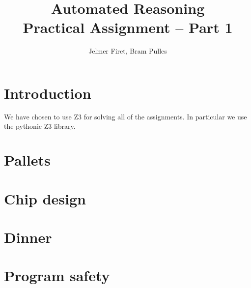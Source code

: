 \documentclass[a4paper]{article}
\author{Jelmer Firet, Bram Pulles}
\title{\textbf{Automated Reasoning\\Practical Assignment -- Part 1}}
\begin{document}
\maketitle

\section{Introduction}
We have chosen to use Z3 for solving all of the assignments. In particular we
use the pythonic Z3 library.

\section{Pallets}


\section{Chip design}


\section{Dinner}


\section{Program safety}
\end{document}
